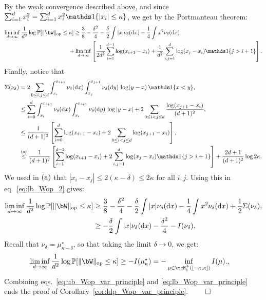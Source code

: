 By the weak convergence described above, and since $\sum_{i=1}^d x_i^2 = \sum_{i=1}^d x_i^2 \indi\{|x_i| \leq \kappa\}$, we get by the Portmanteau theorem:
\begin{align}\label{eq:lb_Wop_2}
    \liminf_{d \to \infty} \frac{1}{d^2} \log \bbP[\|\bW\|_\op \leq \kappa]  
    &\geq \frac{3}{8} - \frac{\delta^2}{4} - \frac{\delta}{2} \int |x| \nu_\delta(\rd x) - \frac{1}{4} \int x^2 \nu_\delta(\rd x) \\
    \nonumber
    &\hspace{-9pt}+ \liminf_{d \to \infty}\left[\frac{1}{2d^2} \sum_{i=1}^{d-1} \log (x_{i+1} - x_i) + \frac{1}{d^2} \sum_{i,j=1}^d \log(x_j - x_i) \indi\{j > i+1\}
    \right].
\end{align}
Finally, notice that 
\begin{align*}
    \Sigma(\nu_\delta) &= 2 \sum_{0 \leq i,j \leq d} \int_{x_i}^{x_{i+1}} \nu_\delta(\rd x) \int_{x_j}^{x_{j+1}} \nu_\delta(\rd y) \, \log (y-x) \, \indi\{x < y\}, \\ 
    &\leq \sum_{i=0}^d \int_{x_i}^{x_{i+1}} \nu_\delta(\rd x) \int_{x_i}^{x_{i+1}} \nu_\delta(\rd y) \, \log |y-x| + 2 \sum_{0 \leq i < j \leq d} \frac{\log(x_{j+1} - x_i)}{(d+1)^2}, \\
    &\leq \frac{1}{(d+1)^2} \left[\sum_{i=0}^d \log(x_{i+1}-x_i) + 2 \sum_{0 \leq i < j \leq d} \log(x_{j+1} - x_i)\right], \\ 
    &\aleq \frac{1}{(d+1)^2} \left[\sum_{i=1}^{d-1} \log(x_{i+1}-x_i) + 2 \sum_{i,j=1}^d \log(x_j - x_i) \indi\{j > i+1\} \right] + \frac{2d+1}{(d+1)^2} \log 2 \kappa.
\end{align*}
We used in $(\rm a)$ that $|x_i - x_j| \leq 2 (\kappa-\delta) \leq 2\kappa$ for all $i,j$.
Using this in eq.~\eqref{eq:lb_Wop_2} gives:
\begin{align*}
    \liminf_{d \to \infty} \frac{1}{d^2} \log \bbP[\|\bW\|_\op \leq \kappa]  
    &\geq \frac{3}{8} - \frac{\delta^2}{4} - \frac{\delta}{2} \int |x| \nu_\delta(\rd x) - \frac{1}{4} \int x^2 \nu_\delta(\rd x) + \frac{1}{2} \Sigma(\nu_\delta), \\
    &\geq - \frac{\delta}{2} \int |x| \nu_\delta(\rd x)  - \frac{\delta^2}{4} - I(\nu_\delta).
\end{align*}
Recall that $\nu_\delta = \mu^\star_{\kappa - \delta}$, so that taking the limit $\delta \to 0$, we get:
\begin{align}\label{eq:lb_Wop_var_principle}
    \liminf_{d \to \infty} \frac{1}{d^2} \log\bbP[\|\bW\|_\op \leq \kappa] 
    &\geq - I(\mu_\kappa^\star) = - \inf_{\mu \in \mcM_1^+([-\kappa,\kappa])} I(\mu).,
\end{align}
Combining eqs.~\eqref{eq:ub_Wop_var_principle} and \eqref{eq:lb_Wop_var_principle} ends the proof of Corollary~\ref{cor:ldp_Wop_var_principle}.
$\qed$

